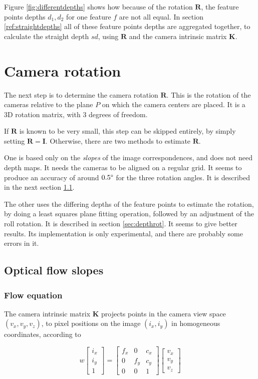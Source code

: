 \documentclass{scrreprt}
\newcommand{\matr}[1]{\mathbf{#1}}
\newcommand{\degr}{\text{\textdegree}}
\begin{document}
Figure \ref{fig:differentdepths} shows how because of the rotation $\matr{R}$, the feature points depths $d_1, d_2$ for one feature $f$ are not all equal. In section \ref{ref:straightdepths} all of these feature points depths are aggregated together, to calculate the straight depth $sd$, using $\matr{R}$ and the camera intrinsic matrix $\matr{K}$.



\section{Camera rotation}
\label{sec:camrotation}
The next step is to determine the camera rotation $\matr{R}$. This is the rotation of the cameras relative to the plane $P$ on which the camera centers are placed. It is a 3D rotation matrix, with 3 degrees of freedom.

If $\matr{R}$ is known to be very small, this step can be skipped entirely, by simply setting $\matr{R} = \matr{I}$. Otherwise, there are two methods to estimate $\matr{R}$.

One is based only on the \emph{slopes} of the image correspondences, and does not need depth maps. It needs the cameras to be aligned on a regular grid. It seems to produce an accuracy of around $0.5\degr$ for the three rotation angles. It is described in the next section \ref{sec:sloperot}.

The other uses the differing depths of the feature points to estimate the rotation, by doing a least squares plane fitting operation, followed by an adjustment of the roll rotation. It is described in section \ref{sec:depthrot}. It seems to give better results. Its implementation is only experimental, and there are probably some errors in it.


\subsection{Optical flow slopes}
\label{sec:sloperot}

\subsubsection{Flow equation}
The camera intrinsic matrix $\matr{K}$ projects points in the camera view space $(v_x, v_y, v_z)$, to pixel positions on the image $(i_x, i_y)$ in homogeneous coordinates, according to

\begin{equation}
w \begin{bmatrix}
	i_x \\ i_y \\ 1
\end{bmatrix}
= \begin{bmatrix}
	f_x & 0 & c_x \\
	0 & f_y & c_y \\
	0 & 0 & 1
\end{bmatrix}
\begin{bmatrix}
	v_x \\ v_y \\ v_z
\end{bmatrix}
\end{equation}
\end{document}
